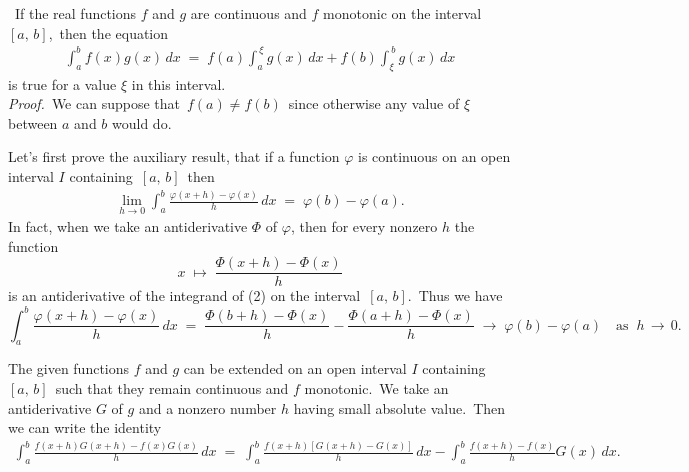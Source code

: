 \documentclass[12pt]{article}
\theoremstyle{definition}
\begin{document}
\textbf{}\, If the real functions $f$ and $g$ are continuous and $f$ monotonic on the interval \,$[a,\,b]$,\, then the equation
\begin{align}
\int_a^b\!f(x)g(x)\,dx \;=\; f(a)\!\int_a^{\,\xi}\!g(x)\,dx+f(b)\!\int_\xi^{\,b}\!g(x)\,dx
\end{align}
is true for a value $\xi$ in this interval.\\


\emph{Proof.}\, We can suppose that\, $f(a) \neq f(b)$\, since otherwise any value of $\xi$ between $a$ and $b$ would do.

Let's first prove the auxiliary result, that if a function $\varphi$ is continuous on an open interval $I$ containing\, 
$[a,\,b]$\, then
\begin{align}
\lim_{h\to0}\int_a^b\!\frac{\varphi(x\!+\!h)\!-\!\varphi(x)}{h}\,dx \;=\; \varphi(b)\!-\varphi(a).
\end{align}
In fact, when we take an antiderivative $\Phi$ of $\varphi$, then for every nonzero $h$ the function
$$x \;\mapsto\; \frac{\Phi(x\!+\!h)-\Phi(x)}{h}$$
is an antiderivative of the integrand of (2) on the interval\, $[a,\,b]$.\, Thus we have
$$\int_a^b\!\frac{\varphi(x\!+\!h)\!-\!\varphi(x)}{h}\,dx 
\;=\; \frac{\Phi(b\!+\!h)\!-\!\Phi(x)}{h}-\frac{\Phi(a\!+\!h)\!-\!\Phi(x)}{h} \;\to\; \varphi(b)\!-\!\varphi(a) 
\quad \mbox{as} \;\; h \,\to\, 0.$$

The given functions $f$ and $g$ can be extended on an open interval $I$ containing\, $[a,\,b]$\, such that they remain continuous and $f$ monotonic.\, We take an antiderivative $G$ of $g$ and a nonzero number $h$ having small absolute value.\, Then we can write the identity
\begin{align}
\int_a^b\!\frac{f(x\!+\!h)G(x\!+\!h)\!-\!f(x)G(x)}{h}\,dx \;=\; 
\int_a^b\!\frac{f(x\!+\!h) [G(x\!+\!h)\!-\!G(x)]}{h}\,dx-\int_a^b\!\frac{f(x\!+\!h)\!-\!f(x)}{h}G(x)\,dx. 
\end{align}
\end{document}
